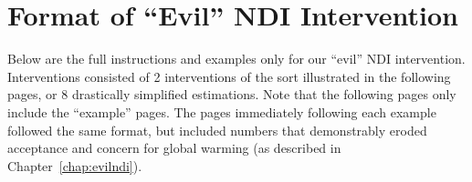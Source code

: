 \chapter{Format of \texorpdfstring{“Evil”}{"Evil"} NDI Intervention}
\label{app:format-ndi}

Below are the full instructions and examples only for our “evil” NDI intervention.
Interventions consisted of 2 interventions of the sort illustrated in the
following pages, or 8 drastically simplified estimations. Note that the
following pages only include the “example” pages. The pages immediately
following each example followed the same format, but included numbers that
demonstrably eroded acceptance and concern for global warming (as described in
Chapter~\ref{chap:evilndi}).


